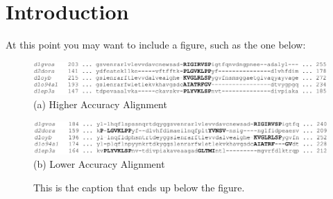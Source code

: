 
\section{Introduction}
\label{sec:ch1:intro}

At this point you may want to include a figure, such as the one below:


\begin{figure}
	\centering
		\includegraphics[width=\textwidth]{chapter_1/figures/alignments_a.pdf}
		(a) Higher Accuracy Alignment
	\par\vspace{1em}
		\includegraphics[width=\textwidth]{chapter_1/figures/alignments_b.pdf}
		(b) Lower Accuracy Alignment
	\caption[This part goes into the list of figures]{
		This is the caption that ends up below the figure. 
	}
	\label{fig:alignCompare}
\end{figure}